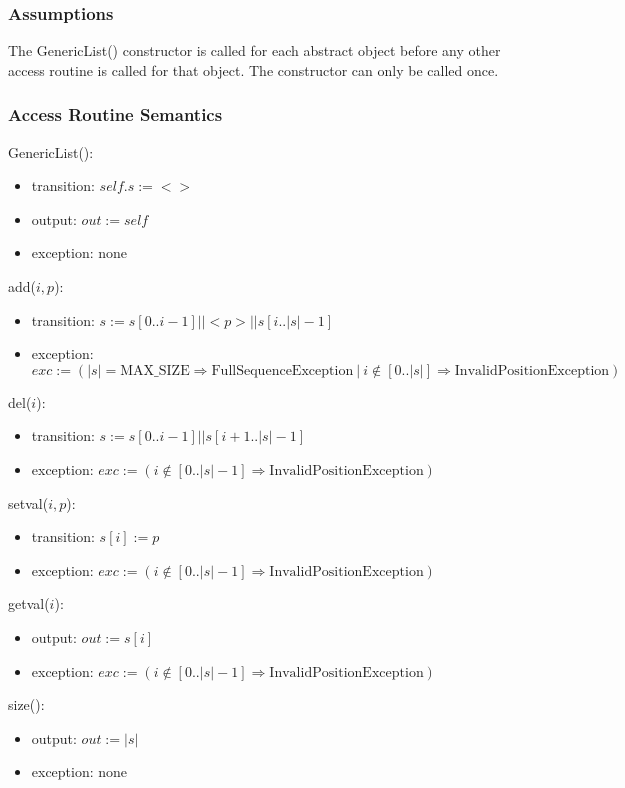 \documentclass[12pt]{article}
\begin{document}
\subsubsection* {Assumptions}
The GenericList() constructor is called for each abstract object before any other access routine is called for that
object.  The constructor can only be called once.
\subsubsection* {Access Routine Semantics}
GenericList():
\begin{itemize}
\item transition: $\mathit{self}.s := < >$
\item output: $\mathit{out} := \mathit{self}$
\item exception: none
\end{itemize}
\noindent add($i, p$):
\begin{itemize}
\item transition: $s := s[0..i-1] || <p> || s[i..|s|-1]$
\item exception: $exc := (|s| = \mathrm{MAX\_SIZE} \Rightarrow  \mathrm{FullSequenceException} ~ | ~ i \notin [0..|s|] \Rightarrow
\mathrm{InvalidPositionException})$
\end{itemize}
\noindent del($i$):
\begin{itemize}
\item transition: $s := s[0..i-1] || s[i+1..|s|-1]$
\item exception:  $exc := (i \notin [0..|s|-1] \Rightarrow \mathrm{InvalidPositionException})$
\end{itemize}
\noindent setval($i, p$):
\begin{itemize}
\item transition: $s[i] := p$
\item exception: $exc := (i \notin [0..|s|-1] \Rightarrow \mathrm{InvalidPositionException})$
\end{itemize}
\noindent getval($i$):
\begin{itemize}
\item output: $out := s[i]$
\item exception: $exc := (i \notin [0..|s|-1] \Rightarrow \mathrm{InvalidPositionException})$
\end{itemize}
\noindent size():
\begin{itemize}
\item output: $out := | s |$
\item exception: none
\end{itemize}
\newpage
\end{document}
